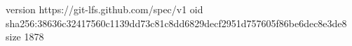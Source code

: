 version https://git-lfs.github.com/spec/v1
oid sha256:38636c32417560c1139dd73c81c8dd6829decf2951d757605f86be6dec8e3de8
size 1878
